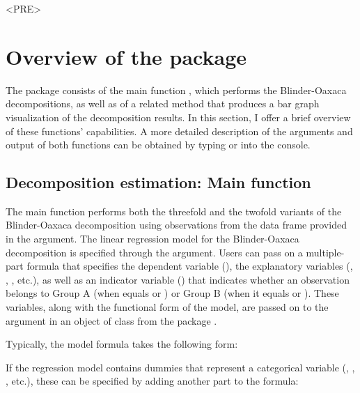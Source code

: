<PRE>\documentclass[nojss]{jss}
\begin{document}
\newpage
\section[Overview of the oaxaca Package]{Overview of the  package}
\label{Section3}
The  package consists of the main function , which performs the Blinder-Oaxaca decompositions, as well as of a related  method that produces a bar graph visualization of the decomposition results. In this section, I offer a brief overview of these functions' capabilities. A more detailed description of the arguments and output of both functions can be obtained by typing  or  into the  console. 

\subsection[Decomposition estimation: Main function oaxaca()]{Decomposition estimation: Main function }

The main function  performs both the threefold and the twofold variants of the Blinder-Oaxaca decomposition using observations from the data frame provided in the  argument. The linear regression model for the Blinder-Oaxaca decomposition is specified through the  argument. Users can pass on a multiple-part formula that specifies the dependent variable (), the explanatory variables (, , , etc.), as well as an indicator variable () that indicates whether an observation belongs to Group A (when  equals  or ) or Group B (when it equals  or ). These variables, along with the functional form of the model, are passed on to the  argument in an object of class  from the  package \citep{ZeileisCroissant2010}.

Typically, the model formula takes the following form:

\begin{center}
\end{center}

If the regression model contains dummies that represent a categorical variable (, , , etc.), these can be specified by adding another part to the formula: 

\begin{center}
\end{center}
\end{document}
